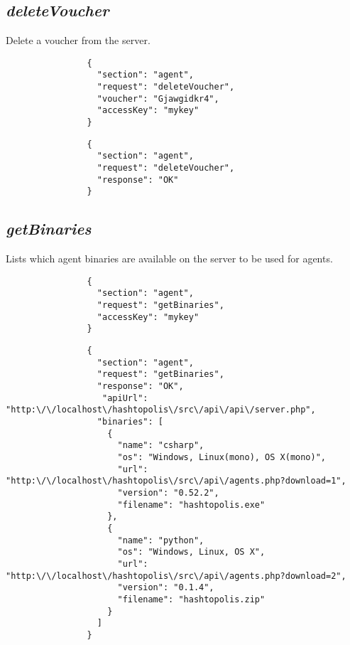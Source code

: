 		\subsection*{\textit{deleteVoucher}}
			Delete a voucher from the server.
			{
				\color{blue}
				\begin{verbatim}
				{
				  "section": "agent",
				  "request": "deleteVoucher",
				  "voucher": "Gjawgidkr4",
				  "accessKey": "mykey"
				}
				\end{verbatim}
			}
			{
				\color{OliveGreen}
				\begin{verbatim}
				{
				  "section": "agent",
				  "request": "deleteVoucher",
				  "response": "OK"
				}
				\end{verbatim}
			}
		\subsection*{\textit{getBinaries}}
			Lists which agent binaries are available on the server to be used for agents.
			{
				\color{blue}
				\begin{verbatim}
				{
				  "section": "agent",
				  "request": "getBinaries",
				  "accessKey": "mykey"
				}
				\end{verbatim}
			}
			{
				\color{OliveGreen}
				\begin{verbatim}
				{
				  "section": "agent",
				  "request": "getBinaries",
				  "response": "OK",
				   "apiUrl": "http:\/\/localhost\/hashtopolis\/src\/api\/api\/server.php",
				  "binaries": [
				    {
				      "name": "csharp",
				      "os": "Windows, Linux(mono), OS X(mono)",
				      "url": "http:\/\/localhost\/hashtopolis\/src\/api\/agents.php?download=1",
				      "version": "0.52.2",
				      "filename": "hashtopolis.exe"
				    },
				    {
				      "name": "python",
				      "os": "Windows, Linux, OS X",
				      "url": "http:\/\/localhost\/hashtopolis\/src\/api\/agents.php?download=2",
				      "version": "0.1.4",
				      "filename": "hashtopolis.zip"
				    }
				  ]
				}
				\end{verbatim}
			}